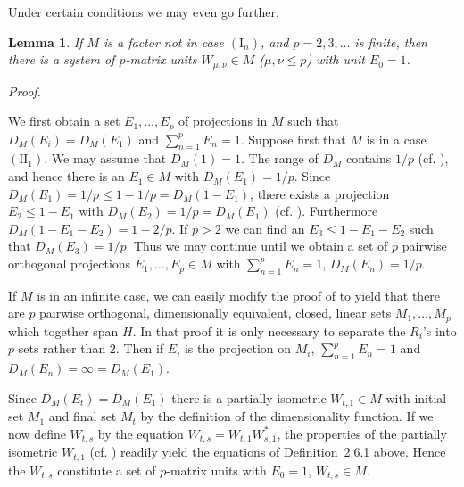 \documentclass[b5paper,twoside]{article}
\newcommand{\defref}[2]{\hyperref[#1]{\mbox{Definition~#2}}}
\theoremstyle{mvnplain}
\newtheorem{lemma}{Lemma}[section]
\renewenvironment{proof}[1][Proof]{%
  \par\addvspace{0.35\baselineskip}%
  \noindent\textit{#1.}\ \normalfont\ignorespaces
}{%
  \par\addvspace{0.35\baselineskip}%
}
\newcommand{\M}{\mathbf M}
\newcommand{\Hilbert}{\mathfrak H}
\def\M{M}%
\def\Hilbert{H}%
\def\mathfrak#1{#1}%
\begin{document}
Under certain conditions we may even go further.
\begin{lemma}\label{lem:2.6.2}
If $\M$ is a factor not in case $(\mathrm I_n)$, and $p=2,3,\ldots$ is
finite, then there is a system of $p$-matrix units
$W_{\mu,\nu}\in\M$ ($\mu,\nu\leq p$) with unit $E_0=1$.
\end{lemma}
\begin{proof}
We first obtain a set $E_1,\ldots,E_p$ of projections in $\M$ such that
$D_{\M}(E_i)=D_{\M}(E_1)$ and $\sum_{n=1}^{p}E_n=1$.  Suppose first that
$\M$ is in a case $(\mathrm{II}_1)$.  We may assume that $D_{\M}(1)=1$.
The range of $D_{\M}$ contains $1/p$ (cf. \cite[p.~172, Theorem~VIII]{ref5}),
and hence there is an $E_1\in\M$ with $D_{\M}(E_1)=1/p$.  Since
$D_{\M}(E_1)=1/p\leq1-1/p=D_{\M}(1-E_1)$, there exists a projection
$E_2\leq1-E_1$ with $D_{\M}(E_2)=1/p=D_{\M}(E_1)$ (cf.
\cite[p.~167, Lemma~8.3.1]{ref5}).  Furthermore
$D_{\M}(1-E_1-E_2)=1-2/p$.  If $p>2$ we can find an
$E_3\leq1-E_1-E_2$ such that $D_{\M}(E_3)=1/p$.  Thus we may continue until
we obtain a set of $p$ pairwise orthogonal projections
$E_1,\ldots,E_p\in\M$ with
$\sum_{n=1}^{p}E_n=1$, $D_{\M}(E_n)=1/p$.

If $\M$ is in an infinite case, we can easily modify the proof of
\cite[p.~157, Lemma~7.2.3]{ref5} to yield that there are $p$ pairwise
orthogonal, dimensionally equivalent, closed, linear sets
$\mathfrak M_1,\ldots,\mathfrak M_p$ which together span $\Hilbert$.  In
that proof it is only necessary to separate the $\mathfrak R_i$'s into $p$
sets rather than $2$.  Then if $E_i$ is the projection on $\mathfrak M_i$,
$\sum_{n=1}^{p}E_n=1$ and $D_{\M}(E_n)=\infty=D_{\M}(E_1)$.

Since $D_{\M}(E_t)=D_{\M}(E_1)$ there is a partially isometric
$W_{t,1}\in\M$ with initial set $\mathfrak M_1$ and final set
$\mathfrak M_t$ by the definition of the dimensionality function.  If we
now define $W_{t,s}$ by the equation $W_{t,s}=W_{t,1}W_{s,1}^{*}$, the
properties of the partially isometric $W_{t,1}$ (cf. \cite[\S4.3]{ref5})
readily yield the equations of \defref{def:2.6.1}{2.6.1} above.  Hence the
$W_{t,s}$ constitute a set of $p$-matrix units with $E_0=1$,
$W_{t,s}\in\M$.
\end{proof}
\end{document}
